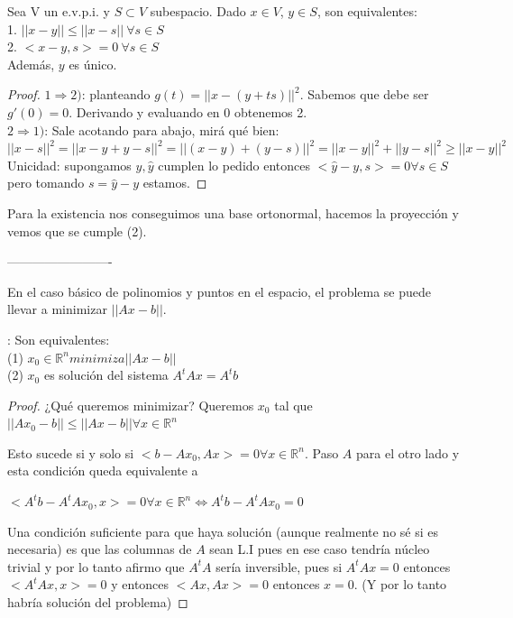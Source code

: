 \documentclass[10pt,a4paper,final]{report}
\begin{document}
\begin{theorem} Sea V un e.v.p.i. y $S \subset V$ subespacio. Dado $x\in V$, $y\in S$, son equivalentes:
\\
1. $||x-y|| \leq ||x-s||\ \forall s\in S$\\
2. $<x-y,s> = 0\ \forall s\in S$\\

Además, $y$ es único.
\end{theorem}

\begin{proof}$1 \Rightarrow 2)$: planteando $g(t)=||x-(y+ts)||^2$. Sabemos que debe ser $g'(0)=0$. Derivando y evaluando en $0$ obtenemos 2.\\

$2 \Rightarrow 1)$: Sale acotando para abajo, mirá qué bien: $||x-s||^2 = ||x-y+y-s||^2 = ||(x-y)+(y-s)||^2 = ||x-y||^2 + ||y-s||^2 \geq ||x-y||^2$\\

Unicidad: supongamos $y,\hat{y}$ cumplen lo pedido entonces $<\hat{y}-y,s>=0 \forall s\in S$ pero tomando $s = \hat{y}-y$ estamos.
\end{proof}

Para la existencia nos conseguimos una base ortonormal, hacemos la proyección y vemos que se cumple (2).


-------------------------

En el caso básico de polinomios y puntos en el espacio, el problema se puede llevar a minimizar $||Ax-b||$.\\

\begin{theorem}: Son equivalentes:
\\
(1) $x_0 \in \mathbb{R}^n minimiza ||Ax-b||$\\
(2) $x_0$ es solución del sistema $A^tA x = A^t b$
\end{theorem}


\begin{proof}
¿Qué queremos minimizar? Queremos $x_0$ tal que $||A x_0 - b || \leq ||A x - b|| \forall x \in \mathbb{R}^n$

Esto sucede si y solo si $<b - A x_0, A x > = 0 \forall x \in \mathbb{R}^n$. Paso $A$ para el otro lado y esta condición queda equivalente a

$<A^tb - A^t A x_0, x> = 0 \forall x \in \mathbb{R}^n \Leftrightarrow A^tb - A^t A x_0 = 0$

Una condición suficiente para que haya solución (aunque realmente no sé si es necesaria) es que las columnas de $A$ sean L.I pues en ese caso tendría núcleo trivial y por lo tanto afirmo que $A^t A$ sería inversible, pues si $A^tAx=0$ entonces $<A^tAx,x> = 0$ y entonces $<Ax,Ax>=0$ entonces $x=0$. (Y por lo tanto habría solución del problema)

\end{proof}
\end{document}
